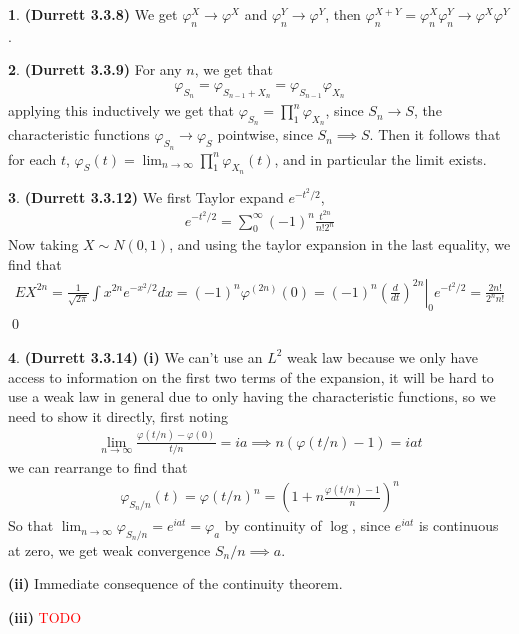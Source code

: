 \documentclass{article}
\theoremstyle{definition}
\newtheorem{pb}{}
\begin{document}
    \begin{pb}\textbf{(Durrett 3.3.8)}
        We get \(\varphi_n^X \to \varphi^X\) and \(\varphi_n^Y \to \varphi^Y\), then \(\varphi_n^{X+Y} = \varphi_n^X \varphi_n^Y \to \varphi^X \varphi^Y\).
    \end{pb}
    \begin{pb}\textbf{(Durrett 3.3.9)}
        For any \(n\), we get that
        \begin{align*}
            \varphi_{S_n} = \varphi_{S_{n-1} + X_n} = \varphi_{S_{n-1}}\varphi_{X_n}
        \end{align*}
        applying this inductively we get that \(\varphi_{S_n} = \prod_1^n \varphi_{X_n}\), since \(S_n \to S\), the characteristic functions \(\varphi_{S_n} \to \varphi_S\) pointwise, since \(S_n \implies S\). Then it follows that for each \(t\), \(\varphi_S(t) = \lim_{n\to\infty} \prod_1^n \varphi_{X_n}(t)\), and in particular the limit exists.
    \end{pb}
    \begin{pb}\textbf{(Durrett 3.3.12)}
        We first Taylor expand \(e^{-t^2/2}\),
        \begin{align*}
            e^{-t^2/2} = \sum_0^\infty (-1)^n\frac{t^{2n}}{n!2^n}
        \end{align*}
        Now taking \(X \sim N(0,1)\), and using the taylor expansion in the last equality, we find that
        \begin{align*}
            EX^{2n} = \frac{1}{\sqrt{2\pi}}\int x^{2n}e^{-x^2/2}dx = (-1)^n \varphi^{(2n)}(0) = (-1)^n\left.\left(\frac{d}{dt}\right)^{2n}\right\vert_0 e^{-t^2/2} = \frac{2n!}{2^n n!}
        \end{align*} \qed
    \end{pb}
    \begin{pb}\textbf{(Durrett 3.3.14)} \textbf{(i)}
        We can't use an \(L^2\) weak law because we only have access to information on the first two terms of the expansion, it will be hard to use a weak law in general due to only having the characteristic functions, so we need to show it directly, first noting
        \begin{align*}
            \lim_{n\to\infty} \frac{\varphi(t/n) - \varphi(0)}{t/n} = ia \implies n(\varphi(t/n) - 1) = iat
        \end{align*}
        we can rearrange to find that
        \begin{align*}
            \varphi_{S_n/n}(t) = \varphi(t/n)^n = \left(1 + n\frac{\varphi(t/n) - 1}{n}\right)^n
        \end{align*}
        So that \(\lim_{n\to\infty} \varphi_{S_n/n} = e^{iat} = \varphi_a\) by continuity of \(\log\), since \(e^{iat}\) is continuous at zero, we get weak convergence \(S_n/n \implies a\).

        \textbf{(ii)} Immediate consequence of the continuity theorem.

        \textbf{(iii)} \textcolor{red}{TODO}
    \end{pb}
\end{document}
